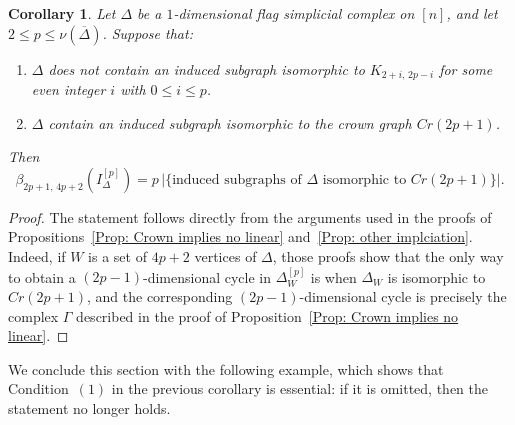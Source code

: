 \documentclass[12pt]{amsart}
\newtheorem{Corollary}[Theorem]{Corollary}
\begin{document}
\begin{Corollary}\label{coro: betti for crown}
Let $\Delta$ be a $1$-dimensional flag simplicial complex on $[n]$, and let
$2 \leq p \leq \nu(\overline{\Delta})$. Suppose that:
\begin{enumerate}
    \item $\Delta$ does not contain an induced subgraph isomorphic to $K_{2+i,\,2p-i}$ for some even integer $i$ with $0 \leq i \leq p$.
    \item $\Delta$ contain an induced subgraph isomorphic to the crown graph $Cr(2p+1)$. 
\end{enumerate} 

Then
\[
\beta_{2p+1,\,4p+2} (I_{\Delta}^{[p]}) =
p\,\bigl|\bigl\{\text{induced subgraphs of } \Delta \text{ isomorphic to } Cr(2p+1)\bigr\}\bigr|.
\]
\end{Corollary}

\begin{proof}
 The statement follows directly from the arguments used in the proofs of Propositions~\ref{Prop: Crown implies no linear} and~\ref{Prop: other implciation}. Indeed, if $W$ is a set of $4p+2$ vertices of $\Delta$, those proofs show that the only way to obtain a $(2p-1)$-dimensional cycle in $\Delta_W^{[p]}$ is when $\Delta_W$ is isomorphic to $Cr(2p+1)$, and the corresponding $(2p-1)$-dimensional cycle is precisely the complex $\Gamma$ described in the proof of Proposition~\ref{Prop: Crown implies no linear}.
\end{proof}


We conclude this section with the following example, which shows that Condition~$(1)$ in the previous corollary is essential: if it is omitted, then the statement no longer holds.
\end{document}
